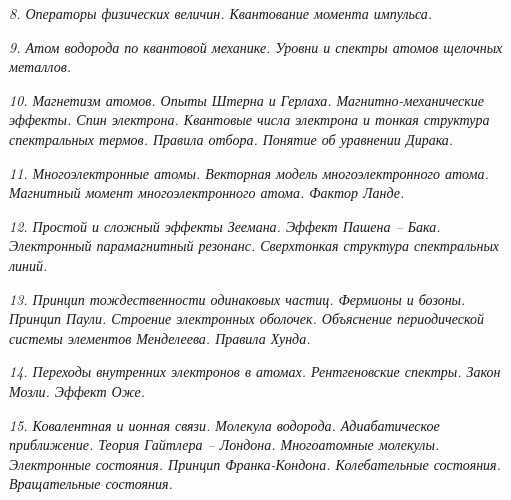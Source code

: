\newpage %

\emph{8. Операторы физических величин. Квантование момента импульса.}

\newpage %

\emph{9. Атом водорода по квантовой механике. Уровни и спектры атомов 
щелочных металлов.}

\newpage %

\emph{10. Магнетизм атомов. Опыты Штерна и Герлаха. Магнитно-механические 
эффекты. Спин электрона. Квантовые числа электрона и тонкая структура 
спектральных термов. Правила отбора. Понятие об уравнении Дирака.}

\newpage %

\emph{11. Многоэлектронные атомы. Векторная модель многоэлектронного 
атома. Магнитный момент многоэлектронного атома. Фактор Ланде.}

\newpage %

\emph{12. Простой и сложный эффекты Зеемана. Эффект Пашена -- Бака. 
Электронный парамагнитный резонанс. Сверхтонкая структура спектральных 
линий.}

\newpage %

\emph{13. Принцип тождественности одинаковых частиц. Фермионы и бозоны. 
Принцип Паули. Строение электронных оболочек. Объяснение периодической 
системы элементов Менделеева. Правила Хунда.}

\newpage %

\emph{14. Переходы внутренних электронов в атомах. Рентгеновские спектры. 
Закон Мозли. Эффект Оже.}

\newpage %

\emph{15. Ковалентная и ионная связи. Молекула водорода. Адиабатическое 
приближение. Теория Гайтлера -- Лондона. Многоатомные молекулы. 
Электронные состояния. Принцип Франка-Кондона. Колебательные состояния. 
Вращательные состояния.}

\newpage %


